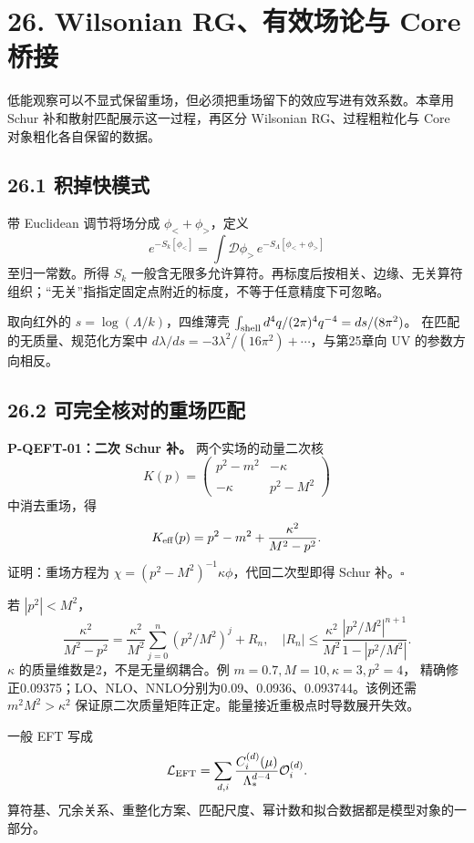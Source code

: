 \documentclass[
  11pt,
  oneside]{book}
\begin{document}
\chapter{26. Wilsonian RG、有效场论与 Core 桥接}\label{ch-26}\hypertarget{ch-26}{}

低能观察可以不显式保留重场，但必须把重场留下的效应写进有效系数。本章用
Schur 补和散射匹配展示这一过程，再区分 Wilsonian RG、过程粗粒化与 Core
对象粗化各自保留的数据。

\section{26.1 积掉快模式}

带 Euclidean 调节将场分成 \(\phi_<+\phi_>\)，定义 \[
e^{-S_k[\phi_<]}=\int\mathcal D\phi_>\,e^{-S_\Lambda[\phi_<+\phi_>]}
\] 至归一常数。所得 \(S_k\)
一般含无限多允许算符。再标度后按相关、边缘、无关算符组织；``无关''指指定固定点附近的标度，不等于任意精度下可忽略。

取向红外的 \(s=\log(\Lambda/k)\)，四维薄壳
\(\int_{\rm shell}d^4q/(2\pi)^4q^{-4}=ds/(8\pi^2)\)。
在匹配的无质量、规范化方案中
\(d\lambda/ds=-3\lambda^2/(16\pi^2)+\cdots\)，与第25章向 UV
的参数方向相反。

\section{26.2 可完全核对的重场匹配}

\protect\hypertarget{p-qeft-01}{}{}

\textbf{P-QEFT-01：二次 Schur 补。} 两个实场的动量二次核 \[
K(p)=\begin{pmatrix}p^2-m^2&-\kappa\\-\kappa&p^2-M^2\end{pmatrix}
\] 中消去重场，得 \[
K_{\rm eff}(p)=p^2-m^2+\frac{\kappa^2}{M^2-p^2}.
\] 证明：重场方程为 \(\chi=(p^2-M^2)^{-1}\kappa\phi\)，代回二次型即得
Schur 补。\(\square\)

若 \(|p^2|<M^2\)， \[
\frac{\kappa^2}{M^2-p^2}
=\frac{\kappa^2}{M^2}\sum_{j=0}^{n}(p^2/M^2)^j+R_n,\quad
|R_n|\le\frac{\kappa^2}{M^2}
\frac{|p^2/M^2|^{n+1}}{1-|p^2/M^2|}.
\] \(\kappa\) 的质量维数是2，不是无量纲耦合。例
\(m=0.7,M=10,\kappa=3,p^2=4\)，
精确修正0.09375；LO、NLO、NNLO分别为0.09、0.0936、0.093744。该例还需
\(m^2M^2>\kappa^2\)
保证原二次质量矩阵正定。能量接近重极点时导数展开失效。

一般 EFT 写成 \[
\mathcal L_{\rm EFT}=\sum_{d,i}\frac{C_i^{(d)}(\mu)}
{\Lambda_*^{d-4}}\mathcal O_i^{(d)}.
\]
算符基、冗余关系、重整化方案、匹配尺度、幂计数和拟合数据都是模型对象的一部分。
\end{document}
